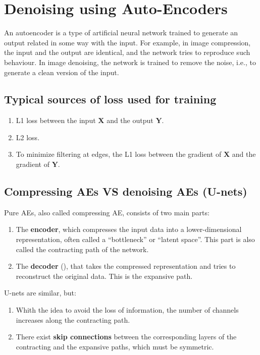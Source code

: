 \chapter{Denoising using Auto-Encoders}

An autoencoder is a type of artificial neural network trained to
generate an output related in some way with the input. For example, in
image compression, the input and the output are identical, and the
network tries to reproduce such behaviour. In image denoising, the
network is trained to remove the noise, i.e., to generate a clean
version of the input.

\section{Typical sources of loss used for training}
\begin{enumerate}
\item L1 loss between the input $\mathbf{X}$ and the output $\mathbf{Y}$.
\item L2 loss.
\item To minimize filtering at edges, the L1 loss between the gradient of $\mathbf{X}$ and the gradient of $\mathbf{Y}$.
\end{enumerate}

\section{Compressing AEs VS denoising AEs (U-nets)}

Pure AEs, also called compressing AE, consists of two main parts:
\begin{enumerate}
\item The \textbf{encoder}, which compresses the
  input data into a lower-dimensional representation, often called a
  ``bottleneck'' or ``latent space''. This part is also called the
  contracting path of the network.
\item The \textbf{decoder} (), that takes the compressed representation
  and tries to reconstruct the original data. This is the expansive path.
\end{enumerate}

U-nets are similar, but:
\begin{enumerate}
\item Whith the idea to avoid the loss of information, the number of
  channels increases along the contracting path.
\item There exist \textbf{skip connections} between the corresponding
  layers of the contracting and the expansive paths, which must be
  symmetric.
\end{enumerate}

